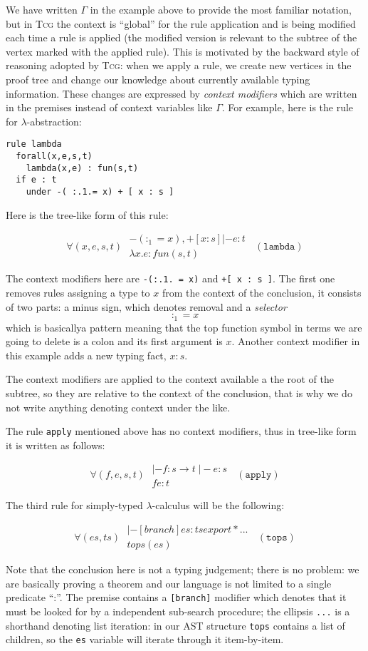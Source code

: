 \documentclass[a4paper,12pt]{article}
\newcommand{\Tcg}{\textsc{Tcg}}
\newcommand{\code}[1]{\texttt{#1}}
\newcommand{\premise}[1]{#1\;}
\newcommand{\tcgrule}[5]{
$$
    \forall (#1)\;
    \begin{array}{c}
	    #2\\
	    \hline
            #3
    \end{array}\;(\mathtt{#4})
$$
}
\begin{document}
We have written $\Gamma$ in the example above to provide the most familiar notation, but in \Tcg{} the context is ``global'' for the rule application and is being modified each time a rule is applied (the modified version is relevant to the subtree of the vertex marked with the applied rule). This is motivated by the backward style of reasoning adopted by \Tcg{}: when we apply a rule, we create new vertices in the proof tree and change our knowledge about currently available typing information. These changes are expressed by \emph{context modifiers} which are written in the premises instead of context variables like $\Gamma$. For example, here is the rule for $\lambda$-abstraction:
\begin{verbatim}
rule lambda
  forall(x,e,s,t)
    lambda(x,e) : fun(s,t)
  if e : t
    under -( :.1.= x) + [ x : s ]
\end{verbatim}
Here is the tree-like form of this rule:
\tcgrule{x, e, s, t}{
    \premise{-( :_1 = x), +[ x : s ] |- e : t}
}{\lambda x. e : fun(s,t)}{lambda}{}
The context modifiers here are \code{-(:.1. = x)} and \code{+[ x : s ]}. The first one removes rules assigning a type to $x$ from the context of the conclusion, it consists of two parts: a minus sign, which denotes removal and a \emph{selector}
$$:_1 = x$$
which is basicallya pattern meaning that the top function symbol in terms we are going to delete is a colon and its first argument is $x$. Another context modifier in this example adds a new typing fact, $x : s$.

The context modifiers are applied to the context available a the root of the subtree, so they are relative to the context of the conclusion, that is why we do not write anything denoting context under the like.

The rule \code{apply} mentioned above has no context modifiers, thus in tree-like form it is written as follows:
\tcgrule{f, e, s, t}{
    \premise{ |- f : s \rightarrow t}
    \premise{ |- e : s}
}{f e : t}{apply}{}

The third rule for simply-typed $\lambda$-calculus will be the following:
\tcgrule{es, ts}{
\premise{|- [branch] es : ts export* ...}
}{tops(es)}{tops}{}
Note that the conclusion here is not a typing judgement; there is no problem: we are basically proving a theorem and our language is not limited to a single predicate ``:''. The premise contains a \code{[branch]} modifier which denotes that it must be looked for by a independent sub-search procedure; the ellipsis \code{...} is a shorthand denoting list iteration: in our AST structure \code{tops} contains a list of children, so the \code{es} variable will iterate through it item-by-item.
\end{document}
